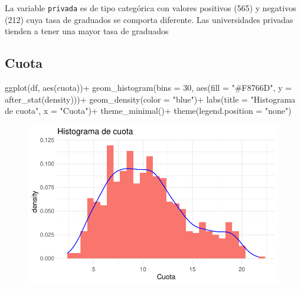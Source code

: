 \documentclass[
  letterpaper,
  DIV=11,
  numbers=noendperiod]{scrartcl}
\newenvironment{Shaded}{\begin{snugshade}}{\end{snugshade}}
\newcommand{\AttributeTok}[1]{\textcolor[rgb]{0.40,0.45,0.13}{#1}}
\newcommand{\DecValTok}[1]{\textcolor[rgb]{0.68,0.00,0.00}{#1}}
\newcommand{\FunctionTok}[1]{\textcolor[rgb]{0.28,0.35,0.67}{#1}}
\newcommand{\NormalTok}[1]{\textcolor[rgb]{0.00,0.23,0.31}{#1}}
\newcommand{\SpecialCharTok}[1]{\textcolor[rgb]{0.37,0.37,0.37}{#1}}
\newcommand{\StringTok}[1]{\textcolor[rgb]{0.13,0.47,0.30}{#1}}
\begin{document}
La variable \texttt{privada} es de tipo categórica con valores positivos
(565) y negativos (212) cuya tasa de graduados se comporta diferente.
Las universidades privadas tienden a tener una mayor tasa de graduados

\hypertarget{cuota}{%
\subsection{Cuota}\label{cuota}}

\begin{Shaded}
\begin{Highlighting}[]
\FunctionTok{ggplot}\NormalTok{(df, }\FunctionTok{aes}\NormalTok{(cuota))}\SpecialCharTok{+}
  \FunctionTok{geom\_histogram}\NormalTok{(}\AttributeTok{bins =} \DecValTok{30}\NormalTok{, }\FunctionTok{aes}\NormalTok{(}\AttributeTok{fill =} \StringTok{"\#F8766D"}\NormalTok{, }\AttributeTok{y =} \FunctionTok{after\_stat}\NormalTok{(density)))}\SpecialCharTok{+}
  \FunctionTok{geom\_density}\NormalTok{(}\AttributeTok{color =} \StringTok{"blue"}\NormalTok{)}\SpecialCharTok{+}
  \FunctionTok{labs}\NormalTok{(}\AttributeTok{title =} \StringTok{"Histograma de cuota"}\NormalTok{,}
       \AttributeTok{x =} \StringTok{"Cuota"}\NormalTok{)}\SpecialCharTok{+}
  \FunctionTok{theme\_minimal}\NormalTok{()}\SpecialCharTok{+}
  \FunctionTok{theme}\NormalTok{(}\AttributeTok{legend.position =} \StringTok{"none"}\NormalTok{)}
\end{Highlighting}
\end{Shaded}

\begin{figure}[H]

{\centering \includegraphics{TP_final_files/figure-pdf/unnamed-chunk-7-1.pdf}

}

\end{figure}
\end{document}
